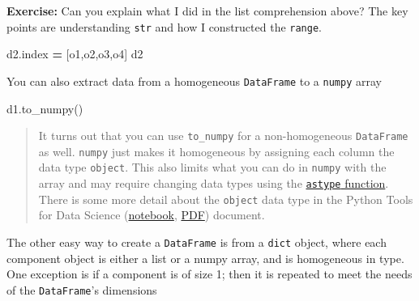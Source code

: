\documentclass[
  letterpaper,
]{scrbook}
\newenvironment{Shaded}{\begin{snugshade}}{\end{snugshade}}
\newcommand{\NormalTok}[1]{#1}
\newcommand{\OperatorTok}[1]{\textcolor[rgb]{0.81,0.36,0.00}{\textbf{#1}}}
\newcommand{\StringTok}[1]{\textcolor[rgb]{0.31,0.60,0.02}{#1}}
\begin{document}
\textbf{Exercise:} Can you explain what I did in the list comprehension above? The key points are understanding \texttt{str} and how I constructed the \texttt{range}.

\begin{Shaded}
\begin{Highlighting}[]
\NormalTok{d2.index }\OperatorTok{=}\NormalTok{ [}\StringTok{\textquotesingle{}o1\textquotesingle{}}\NormalTok{,}\StringTok{\textquotesingle{}o2\textquotesingle{}}\NormalTok{,}\StringTok{\textquotesingle{}o3\textquotesingle{}}\NormalTok{,}\StringTok{\textquotesingle{}o4\textquotesingle{}}\NormalTok{]}
\NormalTok{d2}
\end{Highlighting}
\end{Shaded}

You can also extract data from a homogeneous \texttt{DataFrame} to a \texttt{numpy} array

\begin{Shaded}
\begin{Highlighting}[]
\NormalTok{d1.to\_numpy()}
\end{Highlighting}
\end{Shaded}

\begin{quote}
It turns out that you can use \texttt{to\_numpy} for a non-homogeneous \texttt{DataFrame} as well. \texttt{numpy} just makes it homogeneous by assigning each column the data type \texttt{object}. This also limits what you can do in \texttt{numpy} with the array and may require changing data types using the \href{https://numpy.org/devdocs/reference/generated/numpy.ndarray.astype.html}{\texttt{astype} function}. There is some more detail about the \texttt{object} data type in the Python Tools for Data Science (\href{01_python_tools_ds.ipynb\#object}{notebook}, \href{01_python_tools_ds.pdf}{PDF}) document.
\end{quote}

The other easy way to create a \texttt{DataFrame} is from a \texttt{dict} object, where each component object is either a list or a numpy array, and is homogeneous in type. One exception is if a component is of size 1; then it is repeated to meet the needs of the \texttt{DataFrame}'s dimensions
\end{document}

